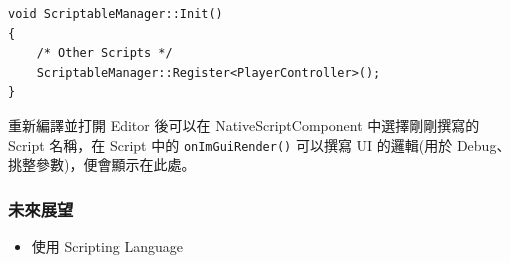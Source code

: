 \begin{lstlisting}
void ScriptableManager::Init()
{
    /* Other Scripts */
    ScriptableManager::Register<PlayerController>();
}   
\end{lstlisting}

重新編譯並打開 Editor 後可以在 NativeScriptComponent 中選擇剛剛撰寫的 Script 名稱，在 Script 中的 \lstinline{onImGuiRender()} 可以撰寫 UI 的邏輯(用於 Debug、挑整參數)，便會顯示在此處。

\subsubsection{未來展望}

\begin{itemize}
\item{使用 Scripting Language}
\end{itemize}

\newpage
